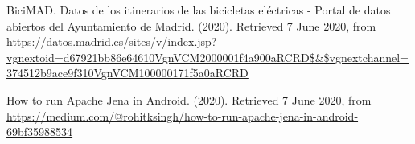 \begin{thebibliography}{99}
 BiciMAD. Datos de los itinerarios de las bicicletas eléctricas - Portal de datos abiertos del Ayuntamiento de Madrid. (2020). Retrieved 7 June 2020, from \url{https://datos.madrid.es/sites/v/index.jsp?vgnextoid=d67921bb86e64610VgnVCM2000001f4a900aRCRD$\&$vgnextchannel=374512b9ace9f310VgnVCM100000171f5a0aRCRD}

 How to run Apache Jena in Android. (2020). Retrieved 7 June 2020, from \url{https://medium.com/@rohitksingh/how-to-run-apache-jena-in-android-69bf35988534}

\end{thebibliography}
